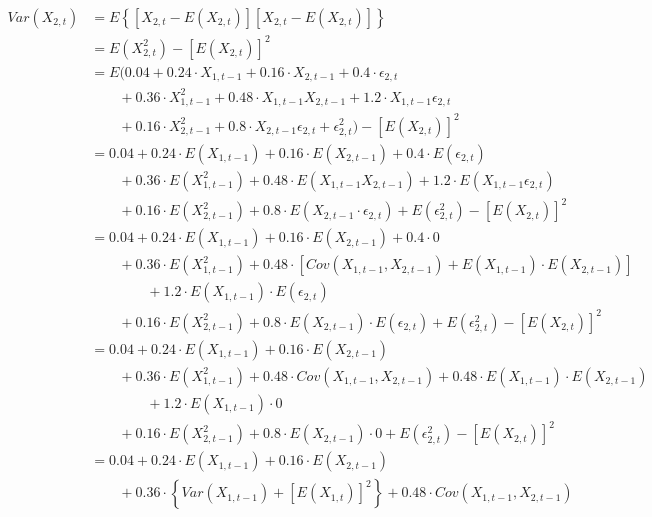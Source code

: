 \begin{solution}
\begin{equation}
\begin{aligned}
Var(X_{2,t}) 	& = E\left\{[X_{2,t} - E(X_{2,t})][X_{2,t} - E(X_{2,t})]\right\} \\
							& = E(X_{2,t}^2) - [E(X_{2,t})]^2 \\
							& = E(0.04 + 0.24 \cdot X_{1,t-1} + 0.16 \cdot X_{2,t-1} + 0.4 \cdot \epsilon_{2,t} \\
							& \qquad			  + 0.36 \cdot X_{1,t-1}^2 + 0.48 \cdot X_{1,t-1}X_{2,t-1} + 1.2 \cdot X_{1,t-1}\epsilon_{2,t} \\ 
							& \qquad				+ 0.16 \cdot X_{2,t-1}^2 + 0.8 \cdot X_{2,t-1}\epsilon_{2,t} 
							        				+ \epsilon_{2,t}^2 ) - [E(X_{2,t})]^2 \\
							& = 0.04 + 0.24 \cdot E(X_{1,t-1}) + 0.16 \cdot E(X_{2,t-1}) +0.4 \cdot E(\epsilon_{2,t}) \\
							& \qquad			  + 0.36 \cdot E(X_{1,t-1}^2) + 0.48 \cdot E(X_{1,t-1}X_{2,t-1}) + 1.2 \cdot E(X_{1,t-1}\epsilon_{2,t}) \\ 
							& \qquad				+ 0.16 \cdot E(X_{2,t-1}^2) + 0.8 \cdot E(X_{2,t-1} \cdot \epsilon_{2,t}) 
							        				+ E(\epsilon_{2,t}^2) - [E(X_{2,t})]^2 \\		
							& = 0.04 + 0.24 \cdot E(X_{1,t-1}) + 0.16 \cdot E(X_{2,t-1}) +0.4 \cdot 0 \\
							& \qquad			  + 0.36 \cdot E(X_{1,t-1}^2) + 0.48 \cdot \left[ Cov(X_{1,t-1},X_{2,t-1}) + E(X_{1,t-1}) \cdot E(X_{2,t-1}) \right] \\
							& \qquad \qquad + 1.2 \cdot E(X_{1,t-1}) \cdot E(\epsilon_{2,t}) \\ 
							& \qquad				+ 0.16 \cdot E(X_{2,t-1}^2) + 0.8 \cdot E(X_{2,t-1}) \cdot E(\epsilon_{2,t}) 
							            		+ E(\epsilon_{2,t}^2) - [E(X_{2,t})]^2 \\	
							& = 0.04 + 0.24 \cdot E(X_{1,t-1}) + 0.16 \cdot E(X_{2,t-1}) \\
							& \qquad			  + 0.36 \cdot E(X_{1,t-1}^2) + 0.48 \cdot Cov(X_{1,t-1},X_{2,t-1}) + 0.48 \cdot E(X_{1,t-1}) \cdot E(X_{2,t-1}) \\
							& \qquad \qquad + 1.2 \cdot E(X_{1,t-1}) \cdot 0 \\ 
							& \qquad				+ 0.16 \cdot E(X_{2,t-1}^2) + 0.8 \cdot E(X_{2,t-1}) \cdot 0 
							        				+ E(\epsilon_{2,t}^2) - [E(X_{2,t})]^2 \\
							& = 0.04 + 0.24 \cdot E(X_{1,t-1}) + 0.16 \cdot E(X_{2,t-1}) \\
							& \qquad			  + 0.36 \cdot \left\{ Var(X_{1,t-1}) + [E(X_{1,t})]^2 \right\}+ 0.48 \cdot Cov(X_{1,t-1},X_{2,t-1})  \\

\end{aligned}
\end{equation}
\end{solution}
